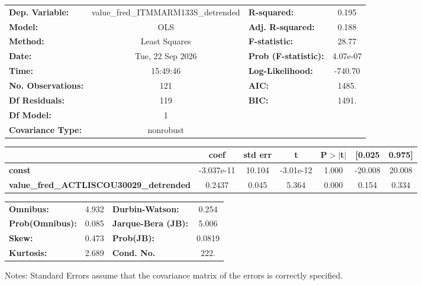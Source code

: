\begin{center}
\begin{tabular}{lclc}
\toprule
\textbf{Dep. Variable:}                         & value\_fred\_ITMMARM133S\_detrended & \textbf{  R-squared:         } &     0.195   \\
\textbf{Model:}                                 &                 OLS                 & \textbf{  Adj. R-squared:    } &     0.188   \\
\textbf{Method:}                                &            Least Squares            & \textbf{  F-statistic:       } &     28.77   \\
\textbf{Date:}                                  &           Tue, 22 Sep 2026          & \textbf{  Prob (F-statistic):} &  4.07e-07   \\
\textbf{Time:}                                  &               15:49:46              & \textbf{  Log-Likelihood:    } &   -740.70   \\
\textbf{No. Observations:}                      &                   121               & \textbf{  AIC:               } &     1485.   \\
\textbf{Df Residuals:}                          &                   119               & \textbf{  BIC:               } &     1491.   \\
\textbf{Df Model:}                              &                     1               & \textbf{                     } &             \\
\textbf{Covariance Type:}                       &              nonrobust              & \textbf{                     } &             \\
\bottomrule
\end{tabular}
\begin{tabular}{lcccccc}
                                                & \textbf{coef} & \textbf{std err} & \textbf{t} & \textbf{P$> |$t$|$} & \textbf{[0.025} & \textbf{0.975]}  \\
\midrule
\textbf{const}                                  &   -3.037e-11  &       10.104     & -3.01e-12  &         1.000        &      -20.008    &       20.008     \\
\textbf{value\_fred\_ACTLISCOU30029\_detrended} &       0.2437  &        0.045     &     5.364  &         0.000        &        0.154    &        0.334     \\
\bottomrule
\end{tabular}
\begin{tabular}{lclc}
\textbf{Omnibus:}       &  4.932 & \textbf{  Durbin-Watson:     } &    0.254  \\
\textbf{Prob(Omnibus):} &  0.085 & \textbf{  Jarque-Bera (JB):  } &    5.006  \\
\textbf{Skew:}          &  0.473 & \textbf{  Prob(JB):          } &   0.0819  \\
\textbf{Kurtosis:}      &  2.689 & \textbf{  Cond. No.          } &     222.  \\
\bottomrule
\end{tabular}
\end{center}

Notes: \newline
 [1] Standard Errors assume that the covariance matrix of the errors is correctly specified.